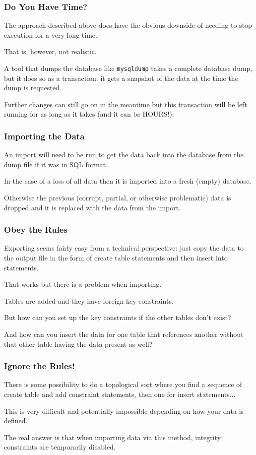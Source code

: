 \begin{frame}
\frametitle{Do You Have Time?}
The approach described above does have the obvious downside of needing to stop execution for a very long time. 

That is, however, not realistic. 

A tool that dumps the database like \texttt{mysqldump} takes a complete database dump, but it does so as a transaction: it gets a snapshot of the data at the time the dump is requested.

Further changes can still go on in the meantime but this transaction will be left running for as long as it takes (and it can be HOURS!).


\end{frame}


\begin{frame}
\frametitle{Importing the Data}

An import will need to be run to get the data back into the database from the dump file if it was in SQL format. 

In the case of a loss of all data then it is imported into a fresh (empty) database.

Otherwise the previous (corrupt, partial, or otherwise problematic) data is dropped and it is replaced with the data from the import.


\end{frame}

\begin{frame}
\frametitle{Obey the Rules}

Exporting seems fairly easy from a technical perspective: just copy the data to the output file in the form of create table statements and then insert into statements. 

That works but there is a problem when importing. 

Tables are added and they have foreign key constraints. 

But how can you set up the key constraints if the other tables don't exist? 

And how can you insert the data for one table that references another without that other table having the data present as well?
\end{frame}


\begin{frame}
\frametitle{Ignore the Rules!}

There is some possibility to do a topological sort where you find a sequence of create table and add constraint statements, then one for insert statements... 

This is very difficult and potentially impossible depending on how your data is defined. 

The real answer is that when importing data via this method, integrity constraints are temporarily disabled.


\end{frame}


